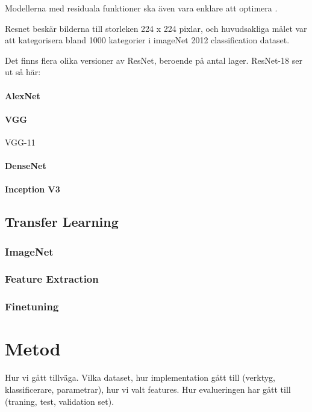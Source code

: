 \documentclass{kththesis}
\begin{document}
      Modellerna med residuala funktioner ska även vara enklare att optimera \parencite{he2016deep}.

      Resnet beskär bilderna till storleken 224 x 224 pixlar, och huvudsakliga målet var att kategorisera bland 1000 kategorier i imageNet 2012 classification dataset. 

      Det finns flera olika versioner av ResNet, beroende på antal lager. ResNet-18 ser ut så här:

      \subsubsection{AlexNet}

      \subsubsection{VGG}
      VGG-11

      \subsubsection{DenseNet}

      \subsubsection{Inception V3}

  \section{Transfer Learning}

    \subsection{ImageNet}

    \subsection{Feature Extraction}

    \subsection{Finetuning}



\chapter{Metod}
Hur vi gått tillväga. Vilka dataset, hur implementation gått till (verktyg, klassificerare, parametrar), hur vi valt features.
Hur evalueringen har gått till (traning, test, validation set).
\end{document}
